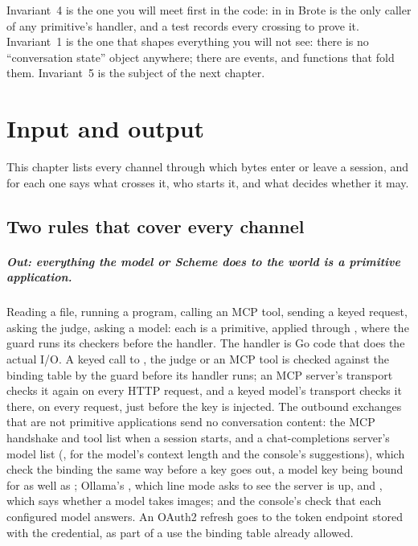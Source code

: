Invariant~4 is the one you will meet first in the code:  in
 in Brote is the only caller of any primitive's handler,
and a test records every crossing to prove it. Invariant~1 is the one that
shapes everything you will not see: there is no ``conversation state'' object
anywhere; there are events, and functions that fold them. Invariant~5 is the
subject of the next chapter.

\chapter{Input and output}\label{ch:io}

This chapter lists every channel through which bytes enter or leave a
\nodwyn{} session, and for each one says what crosses it, who starts it, and
what decides whether it may.

\section{Two rules that cover every channel}

\paragraph{Out: everything the model or Scheme does to the world is a
primitive application.} Reading a file, running a program, calling an MCP
tool, sending a keyed request, asking the judge, asking a model: each is a
primitive, applied through , where the guard runs its
checkers before the handler. The handler is Go code that does the actual
I/O. A keyed call to , the judge or an MCP tool is
checked against the binding table by the guard before its handler runs; an
MCP server's transport checks it again on every HTTP request, and a keyed
model's transport checks it there, on every request, just before the key
is injected. The outbound exchanges that are not primitive applications
send no conversation content: the MCP handshake and tool list when a
session starts, and a chat-completions server's model list
(, for the model's context length and the console's
suggestions), which check the binding the same way before a key goes out,
a model key being bound for  as well as ; Ollama's
, which line mode asks to see the server is up, and
, which says whether a model takes images; and the
console's check that each configured model answers. An OAuth2 refresh
goes to the token endpoint stored with the credential, as part of a use
the binding table already allowed.

